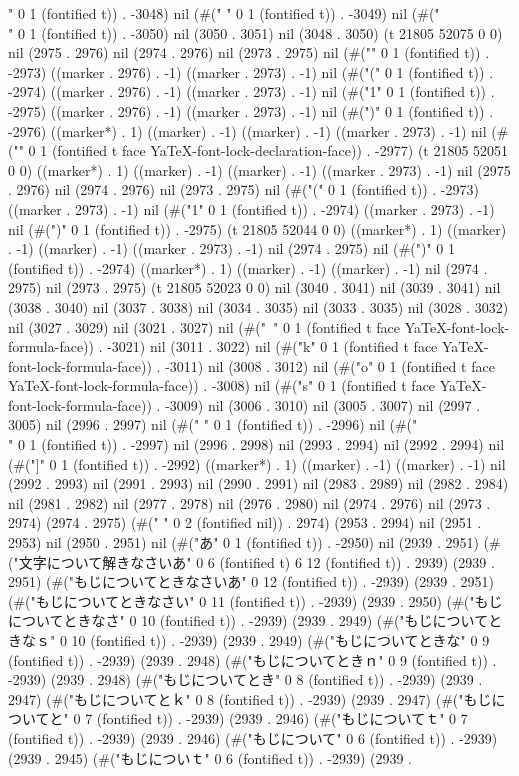 {" 0 1 (fontified t)) . -3048) nil (#("	" 0 1 (fontified t)) . -3049) nil (#("\\" 0 1 (fontified t)) . -3050) nil (3050 . 3051) nil (3048 . 3050) (t 21805 52075 0 0) nil (2975 . 2976) nil (2974 . 2976) nil (2973 . 2975) nil (#("{" 0 1 (fontified t)) . -2973) ((marker . 2976) . -1) ((marker . 2973) . -1) nil (#("(" 0 1 (fontified t)) . -2974) ((marker . 2976) . -1) ((marker . 2973) . -1) nil (#("1" 0 1 (fontified t)) . -2975) ((marker . 2976) . -1) ((marker . 2973) . -1) nil (#(")" 0 1 (fontified t)) . -2976) ((marker*) . 1) ((marker) . -1) ((marker) . -1) ((marker . 2973) . -1) nil (#("}" 0 1 (fontified t face YaTeX-font-lock-declaration-face)) . -2977) (t 21805 52051 0 0) ((marker*) . 1) ((marker) . -1) ((marker) . -1) ((marker . 2973) . -1) nil (2975 . 2976) nil (2974 . 2976) nil (2973 . 2975) nil (#("(" 0 1 (fontified t)) . -2973) ((marker . 2973) . -1) nil (#("1" 0 1 (fontified t)) . -2974) ((marker . 2973) . -1) nil (#(")" 0 1 (fontified t)) . -2975) (t 21805 52044 0 0) ((marker*) . 1) ((marker) . -1) ((marker) . -1) ((marker . 2973) . -1) nil (2974 . 2975) nil (#(")" 0 1 (fontified t)) . -2974) ((marker*) . 1) ((marker) . -1) ((marker) . -1) nil (2974 . 2975) nil (2973 . 2975) (t 21805 52023 0 0) nil (3040 . 3041) nil (3039 . 3041) nil (3038 . 3040) nil (3037 . 3038) nil (3034 . 3035) nil (3033 . 3035) nil (3028 . 3032) nil (3027 . 3029) nil (3021 . 3027) nil (#("~" 0 1 (fontified t face YaTeX-font-lock-formula-face)) . -3021) nil (3011 . 3022) nil (#("k" 0 1 (fontified t face YaTeX-font-lock-formula-face)) . -3011) nil (3008 . 3012) nil (#("o" 0 1 (fontified t face YaTeX-font-lock-formula-face)) . -3008) nil (#("s" 0 1 (fontified t face YaTeX-font-lock-formula-face)) . -3009) nil (3006 . 3010) nil (3005 . 3007) nil (2997 . 3005) nil (2996 . 2997) nil (#(" " 0 1 (fontified t)) . -2996) nil (#("\\" 0 1 (fontified t)) . -2997) nil (2996 . 2998) nil (2993 . 2994) nil (2992 . 2994) nil (#("]" 0 1 (fontified t)) . -2992) ((marker*) . 1) ((marker) . -1) ((marker) . -1) nil (2992 . 2993) nil (2991 . 2993) nil (2990 . 2991) nil (2983 . 2989) nil (2982 . 2984) nil (2981 . 2982) nil (2977 . 2978) nil (2976 . 2980) nil (2974 . 2976) nil (2973 . 2974) (2974 . 2975) (#("  " 0 2 (fontified nil)) . 2974) (2953 . 2994) nil (2951 . 2953) nil (2950 . 2951) nil (#("あ" 0 1 (fontified t)) . -2950) nil (2939 . 2951) (#("文字について解きなさいあ" 0 6 (fontified t) 6 12 (fontified t)) . 2939) (2939 . 2951) (#("もじについてときなさいあ" 0 12 (fontified t)) . -2939) (2939 . 2951) (#("もじについてときなさい" 0 11 (fontified t)) . -2939) (2939 . 2950) (#("もじについてときなさ" 0 10 (fontified t)) . -2939) (2939 . 2949) (#("もじについてときなｓ" 0 10 (fontified t)) . -2939) (2939 . 2949) (#("もじについてときな" 0 9 (fontified t)) . -2939) (2939 . 2948) (#("もじについてときｎ" 0 9 (fontified t)) . -2939) (2939 . 2948) (#("もじについてとき" 0 8 (fontified t)) . -2939) (2939 . 2947) (#("もじについてとｋ" 0 8 (fontified t)) . -2939) (2939 . 2947) (#("もじについてと" 0 7 (fontified t)) . -2939) (2939 . 2946) (#("もじについてｔ" 0 7 (fontified t)) . -2939) (2939 . 2946) (#("もじについて" 0 6 (fontified t)) . -2939) (2939 . 2945) (#("もじについｔ" 0 6 (fontified t)) . -2939) (2939 . }

